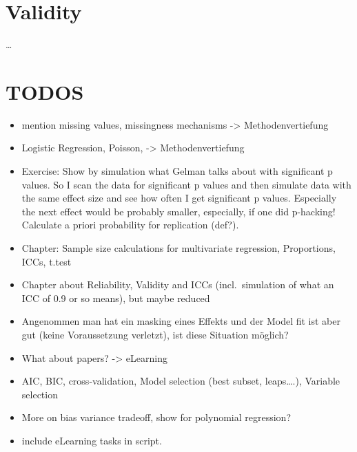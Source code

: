 \documentclass[
]{book}
\providecommand{\tightlist}{%
  \setlength{\itemsep}{0pt}\setlength{\parskip}{0pt}}
\begin{document}
\section{Validity}\label{validity}

\ldots{}

\section{TODOS}\label{todos}

\begin{itemize}
\tightlist
\item
  mention missing values, missingness mechanisms -\textgreater{} Methodenvertiefung
\item
  Logistic Regression, Poisson, -\textgreater{} Methodenvertiefung
\item
  Exercise: Show by simulation what Gelman talks about with significant p values. So I scan the data
  for significant p values and then simulate data with the same effect size and see how often
  I get significant p values. Especially the next effect would be probably smaller,
  especially, if one did p-hacking! Calculate a priori probability for replication (def?).
\item
  Chapter: Sample size calculations for multivariate regression, Proportions, ICCs, t.test
\item
  Chapter about Reliability, Validity and ICCs (incl.~simulation of what an ICC of 0.9 or so means), but maybe reduced
\item
  Angenommen man hat ein masking eines Effekts und der Model fit ist aber gut (keine Voraussetzung verletzt),
  ist diese Situation möglich?
\item
  What about papers? -\textgreater{} eLearning
\item
  AIC, BIC, cross-validation, Model selection (best subset, leaps\ldots.), Variable selection
\item
  More on bias variance tradeoff, show for polynomial regression?
\item
  include eLearning tasks in script.
\end{itemize}


\end{document}
